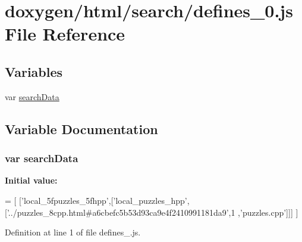\hypertarget{a00070}{}\section{doxygen/html/search/defines\+\_\+0.js File Reference}
\label{a00070}
\subsection*{Variables}
\begin{DoxyCompactItemize}
\item 
var \hyperlink{a00070_ad01a7523f103d6242ef9b0451861231e}{search\+Data}
\end{DoxyCompactItemize}


\subsection{Variable Documentation}
\hypertarget{a00070_ad01a7523f103d6242ef9b0451861231e}{}
\subsubsection[{search\+Data}]{\setlength{\rightskip}{0pt plus 5cm}var search\+Data}\label{a00070_ad01a7523f103d6242ef9b0451861231e}
{\bfseries Initial value\+:}
\begin{DoxyCode}
=
[
  [\textcolor{stringliteral}{'local\_5fpuzzles\_5fhpp'},[\textcolor{stringliteral}{'local\_puzzles\_hpp'},[\textcolor{stringliteral}{'../puzzles\_8cpp.html#a6cbefc5b53d93ca9e4f2410991181da9'},1
      ,\textcolor{stringliteral}{'puzzles.cpp'}]]]
]
\end{DoxyCode}


Definition at line 1 of file defines\+\_.\+js.

